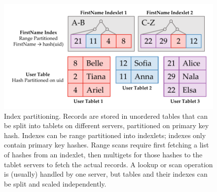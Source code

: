 \begin{figure}[t]
\centering
\includegraphics[width=1.0\columnwidth]{figures/ramcloud-index.pdf}
\caption{Index partitioning. Records are stored in unordered tables that can be
  split into tablets on different servers, partitioned on primary key hash.
  Indexes can be range partitioned into indexlets; indexes only contain primary
  key hashes. Range scans require first fetching a list of hashes from an
  indexlet, then multigets for those hashes to the tablet servers to fetch the
  actual records.  A lookup or scan operation is (usually) handled by one
  server, but tables and their indexes can be split and scaled independently.}
\label{fig:index}
\end{figure}
